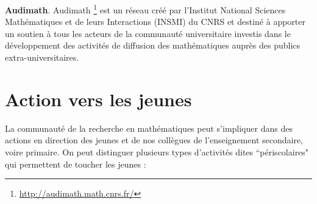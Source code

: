 \medskip
{\bf Audimath}. Audimath \footnote{\url{http://audimath.math.cnrs.fr/}} est un r\'eseau cr\'e\'e par l’Institut National Sciences Math\'ematiques et de leurs Interactions (INSMI) du CNRS et destin\'e \`a apporter un soutien \`a tous les acteurs de la communaut\'e universitaire investis dans le d\'eveloppement des activit\'es de diffusion des math\'ematiques aupr\`es des publics extra-universitaires.



\section{Action vers les jeunes} \label{jeunes}

La communaut\'e de la recherche en math\'ematiques peut s'impliquer dans des actions en direction des jeunes et de
nos coll\`egues de l'enseignement secondaire, voire primaire.
On peut distinguer plusieurs types d'activit\'es dites ``p\'eriscolaires" qui permettent de toucher les jeunes :
